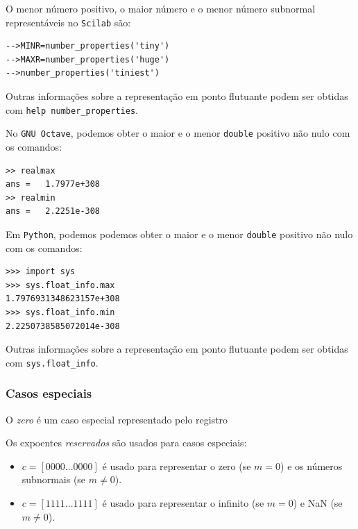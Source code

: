 \ifisscilab
\begin{obs}
  O menor número positivo, o maior número e o menor número subnormal representáveis  no \verb+Scilab+ são:
\begin{verbatim}
-->MINR=number_properties('tiny')
-->MAXR=number_properties('huge')
-->number_properties('tiniest')
\end{verbatim}
Outras informações sobre a representação em ponto flutuante podem ser obtidas com \verb+help number_properties+.
\end{obs}
\fi
\ifisoctave
\begin{obs}
  No \verb+GNU Octave+, podemos obter o maior e o menor \verb+double+ positivo não nulo com os comandos:
\begin{verbatim}
>> realmax
ans =   1.7977e+308
>> realmin
ans =   2.2251e-308
\end{verbatim}
\end{obs}
\fi
\ifispython
\begin{obs}
  Em \verb+Python+, podemos podemos obter o maior e o menor \verb+double+ positivo não nulo com os comandos:
\begin{verbatim}
>>> import sys
>>> sys.float_info.max
1.7976931348623157e+308
>>> sys.float_info.min
2.2250738585072014e-308
\end{verbatim}
Outras informações sobre a representação em ponto flutuante podem ser obtidas com \verb+sys.float_info+.
\end{obs}
\fi

\subsubsection{Casos especiais}
O \emph{zero} é um caso especial representado pelo registro
\begin{equation}
[0|\RED{000~0000~0000} |0000~0000~0000...0000~0000]
\end{equation}

Os expoentes \emph{reservados} são usados para casos especiais:
\begin{itemize}
 \item $c=[0000...0000]$ é usado para representar o zero (se $m=0$) e os números subnormais (se $m\neq 0$).
 \item $c=[1111...1111]$ é usado para representar o infinito (se $m=0$) e NaN (se $m\neq 0$).
\end{itemize}

